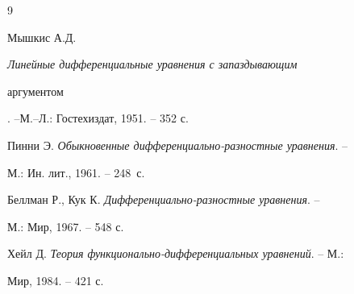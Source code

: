 \begin{thebibliography}{9}







Мышкис А.Д. {\em Линейные дифференциальные уравнения с запаздывающим


аргументом}. --\linebreak М.--Л.: Гостехиздат, 1951. -- 352 с.




Пинни Э. {\em Обыкновенные дифференциально-разностные уравнения}. --


М.: Ин. лит., 1961. -- 248~с.




Беллман Р., Кук К. {\em Дифференциально-разностные уравнения}. --


М.: Мир, 1967. -- 548 с.




Хейл Д. {\em Теория функционально-дифференциальных уравнений}. -- М.:


Мир, 1984. -- 421 с.





\end{thebibliography}





\vskip 2cm











\label{end}





